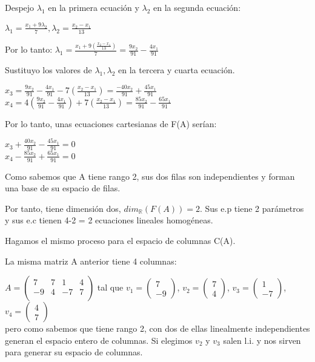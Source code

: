 \documentclass[11pt, a4paper]{article}
\newif\IfInSansMode
\newcommand{\R}{\mathbb{R}} \newcommand{\N}{\mathbb{N}}
\theoremstyle{theorem-style}
\theoremstyle{definition-style}
\theoremstyle{remark-style}
\theoremstyle{example-style}
\begin{document}
 Despejo $\lambda_1$ en la primera ecuación y $\lambda_2$ en la segunda ecuación:
 
 $\lambda_1 = \frac{x_1+9\lambda_2}{7}, \lambda_2 = \frac{x_2-x_1}{13}$
 
 Por lo tanto: $\lambda_1 = \frac{x_1+9(\frac{x_2-x_1}{13})}{7} = \frac{9x_2}{91}-\frac{4x_1}{91}$
 
 Sustituyo los valores de $ \lambda_1,\lambda_2$ en la tercera y cuarta ecuación.
 
 $x_3 = \frac{9x_2}{91}-\frac{4x_1}{91}-7(\frac{x_2-x_1}{13})=\frac{-40x_2}{91}+\frac{45x_1}{91}$ \\
 $x_4 = 4(\frac{9x_2}{91}-\frac{4x_1}{91})+7(\frac{x_2-x_1}{13}) = \frac{85x_2}{91}-\frac{65x_1}{91}$
 
 Por lo tanto, unas ecuaciones cartesianas de F(A) serían:
 
 $x_3 +\frac{40x_2}{91}-\frac{45x_1}{91}=0$ \\
 $x_4 - \frac{85x_2}{91}+\frac{65x_1}{91}=0$
 
Como sabemos que A tiene rango 2, sus dos filas son independientes y forman una base de su espacio de filas.

Por tanto, tiene dimensión dos, $dim_{\R}(F(A))=2$. Sus e.p tiene 2 parámetros y sus e.c tienen 4-2 = 2 ecuaciones lineales homogéneas.

Hagamos el mismo proceso para el espacio de columnas C(A).

La misma matriz A anterior tiene 4 columnas:

$A = \begin{pmatrix}
7 & 7 & 1 & 4 \\
-9 & 4 & -7 & 7 \\
\end{pmatrix}$ tal que $v_1 = \begin{pmatrix} 7 \\ -9 \end{pmatrix}$, $v_2 = \begin{pmatrix} 7 \\ 4 \end{pmatrix}$, $v_3 = \begin{pmatrix} 1 \\ -7 \end{pmatrix}$, $v_4 = \begin{pmatrix} 4 \\ 7 \end{pmatrix}$ \\ pero como sabemos que tiene rango 2, con dos de ellas linealmente independientes generan el espacio entero de columnas. Si elegimos $v_2$ y $v_3$ salen l.i. y nos sirven para generar su espacio de columnas.
\end{document}
